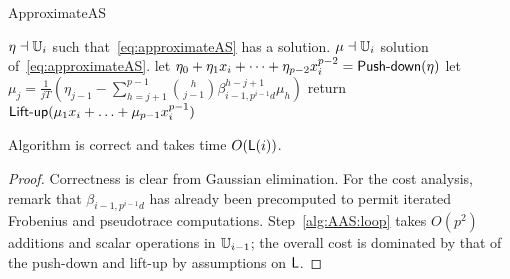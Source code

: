 \begin{algorithm}
  \caption{ApproximateAS} 
  \begin{algorithmic}[1]
    \REQUIRE $\eta\dashv\mathbb{U}_i$ such that~\eqref{eq:approximateAS} has a solution.
    \ENSURE $\mu\dashv\mathbb{U}_i$ solution of~\eqref{eq:approximateAS}.
    \STATE let $\eta_0 + \eta_1 x_i + \dots + \eta_{p-2} x_i^{p-2}=\text{{\sf Push-down}}(\eta)$
    \STATE let $\mu_j =
   \frac{1}{jT}\left(\eta_{j-1} -
  \sum_{h=j+1}^{p-1}\binom{h}{j-1}\beta_{i-1,p^{i-1}d}^{h-j+1}\mu_h\right)$
\ENDFOR
\STATE return $\text{{\sf Lift-up}}(\mu_1 x_i + \ldots + \mu_{p-1} x_i^{p-1})$
\end{algorithmic}
\end{algorithm}


\begin{theorem}
  \label{th:approximateAS}
  Algorithm  is correct and takes time $O(\mathsf{L}(i))$.
\end{theorem}

\begin{proof} Correctness is clear from Gaussian elimination.  For the cost
analysis, remark that $\beta_{i-1,p^{i-1}d}$ has already been
precomputed to permit iterated Frobenius and pseudotrace
computations. Step~\ref{alg:AAS:loop} takes $O(p^2)$ additions and
scalar operations in $\mathbb{U}_{i-1}$; the overall cost is dominated by that
of the push-down and lift-up by assumptions on $\mathsf{L}$. \end{proof}

